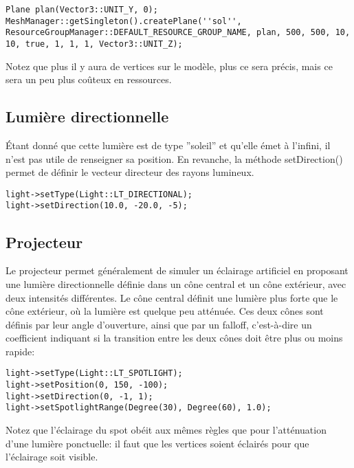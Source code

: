\begin{lstlisting}
Plane plan(Vector3::UNIT_Y, 0);
MeshManager::getSingleton().createPlane(''sol'', ResourceGroupManager::DEFAULT_RESOURCE_GROUP_NAME, plan, 500, 500, 10, 10, true, 1, 1, 1, Vector3::UNIT_Z);
\end{lstlisting}



Notez que plus il y aura de vertices sur le modèle, plus ce sera précis, mais ce sera un peu plus coûteux en ressources.




\subsection{Lumière directionnelle}

Étant donné que cette lumière est de type ''soleil'' et qu'elle émet à l'infini, il n'est pas utile de renseigner sa position. En revanche, la méthode setDirection() permet de définir le vecteur directeur des rayons lumineux.

\begin{lstlisting}
light->setType(Light::LT_DIRECTIONAL);
light->setDirection(10.0, -20.0, -5);
\end{lstlisting}






\subsection{Projecteur}

Le projecteur permet généralement de simuler un éclairage artificiel en proposant une lumière directionnelle définie dans un cône central et un cône extérieur, avec deux intensités différentes. Le cône central définit une lumière plus forte que le cône extérieur, où la lumière est quelque peu atténuée. Ces deux cônes sont définis par leur angle d'ouverture, ainsi que par un falloff, c'est-à-dire un coefficient indiquant si la transition entre les deux cônes doit être plus ou moins rapide:
\begin{lstlisting}
light->setType(Light::LT_SPOTLIGHT);
light->setPosition(0, 150, -100);
light->setDirection(0, -1, 1);
light->setSpotlightRange(Degree(30), Degree(60), 1.0);
\end{lstlisting}


Notez que l'éclairage du spot obéit aux mêmes règles que pour l'atténuation d'une lumière ponctuelle: il faut que les vertices soient éclairés pour que l'éclairage soit visible.


